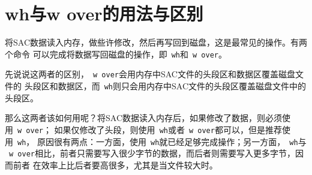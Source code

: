 \section{wh与w over的用法与区别}
将SAC数据读入内存，做些许修改，然后再写回到磁盘，这是最常见的操作。有两个命令
可以完成将数据写回磁盘的操作，即~\verb+wh+和~\verb+w over+。

先说说这两者的区别，~\verb+w over+会用内存中SAC文件的头段区和数据区覆盖磁盘文件的
头段区和数据区，而~\verb+wh+则只会用内存中SAC文件的头段区覆盖磁盘文件中的头段区。

那么这两者该如何用呢？将SAC数据读入内存后，如果修改了数据，则必须使用~\verb+w over+；
如果仅修改了头段，则使用~\verb+wh+或者~\verb+w over+都可以，但是推荐使用~\verb+wh+，
原因很有两点：一方面，使用~\verb+wh+就已经足够完成操作；另一方面，~\verb+wh+与
~\verb+w over+相比，前者只需要写入很少字节的数据，而后者则需要写入更多字节，因而前者
在效率上比后者要高很多，尤其是当文件较大时。
